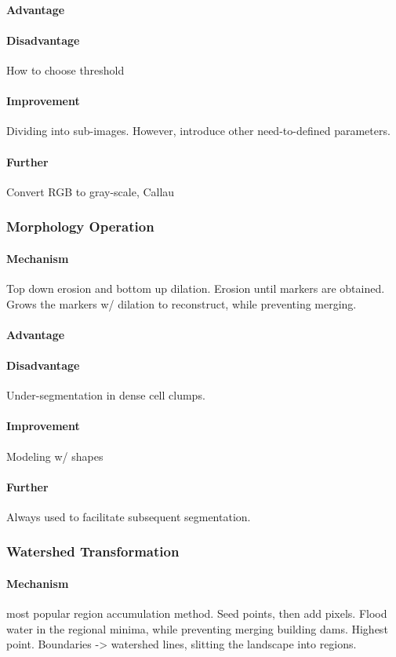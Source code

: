 \documentclass[10pt,a4paper]{article}
\begin{document}
\paragraph{Advantage}
\paragraph{Disadvantage}
How to choose threshold
\paragraph{Improvement}
Dividing into sub-images. However, introduce other need-to-defined parameters.
\paragraph{Further}
Convert RGB to gray-scale, Callau

\subsubsection{Morphology Operation}
\paragraph{Mechanism}
Top down erosion and bottom up dilation. Erosion until markers are obtained. Grows the markers w/ dilation to reconstruct, while preventing merging.
\paragraph{Advantage}
\paragraph{Disadvantage}
Under-segmentation in dense cell clumps.
\paragraph{Improvement}
Modeling w/ shapes
\paragraph{Further}
Always used to facilitate subsequent segmentation.

\subsubsection{Watershed Transformation}
\paragraph{Mechanism}
most popular region accumulation method. Seed points, then add pixels. Flood water in the regional minima, while preventing merging building dams. Highest point. Boundaries -> watershed lines, slitting the landscape into regions.
\end{document}
